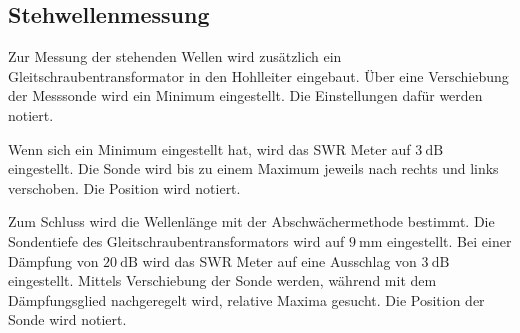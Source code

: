 \subsection{Stehwellenmessung}
Zur Messung der stehenden Wellen wird zusätzlich ein Gleitschraubentransformator in den Hohlleiter eingebaut. Über eine Verschiebung der Messsonde wird ein Minimum eingestellt. Die Einstellungen dafür werden notiert. 

Wenn sich ein Minimum eingestellt hat, wird das SWR Meter auf $\SI{3}{\deci\bel}$ eingestellt. Die Sonde wird bis zu einem Maximum jeweils nach rechts und links verschoben. Die Position wird notiert.

Zum Schluss wird die Wellenlänge mit der Abschwächermethode bestimmt. Die Sondentiefe des Gleitschraubentransformators wird auf $\SI{9}{\milli\meter}$ eingestellt. Bei einer Dämpfung von $\SI{20}{\deci\bel}$ wird das SWR Meter auf eine Ausschlag von $\SI{3}{\deci\bel}$ eingestellt. Mittels Verschiebung der Sonde werden, während mit dem Dämpfungsglied nachgeregelt wird, relative Maxima gesucht. Die Position der Sonde wird notiert.
